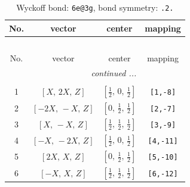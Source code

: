 \documentclass[fleqn,8pt]{jsarticle}
\begin{document}
\renewcommand{\arraystretch}{1.2}
\begin{longtable}{cccc}
\caption{Wyckoff bond: {\tt 6e@3g}, bond symmetry: {\tt .2.}}
 \\
 \hline \hline
No. & vector & center & mapping \\ \hline \endfirsthead

\multicolumn{3}{l}{\tablename\ \thetable{}} \\
 \hline \hline
No. & vector & center & mapping \\ \hline \endhead

 \hline \hline
\multicolumn{3}{r}{\footnotesize\it continued ...} \\ \endfoot

 \hline \hline
\multicolumn{3}{r}{} \\ \endlastfoot

1 & $\left[ X,\, 2 X,\, Z \right]$ & $\left[ \frac{1}{2},\, 0,\, \frac{1}{2} \right]$ & {\tt [1,-8]} \\ \hline
2 & $\left[ - 2 X,\, - X,\, Z \right]$ & $\left[ 0,\, \frac{1}{2},\, \frac{1}{2} \right]$ & {\tt [2,-7]} \\ \hline
3 & $\left[ X,\, - X,\, Z \right]$ & $\left[ \frac{1}{2},\, \frac{1}{2},\, \frac{1}{2} \right]$ & {\tt [3,-9]} \\ \hline
4 & $\left[ - X,\, - 2 X,\, Z \right]$ & $\left[ \frac{1}{2},\, 0,\, \frac{1}{2} \right]$ & {\tt [4,-11]} \\ \hline
5 & $\left[ 2 X,\, X,\, Z \right]$ & $\left[ 0,\, \frac{1}{2},\, \frac{1}{2} \right]$ & {\tt [5,-10]} \\ \hline
6 & $\left[ - X,\, X,\, Z \right]$ & $\left[ \frac{1}{2},\, \frac{1}{2},\, \frac{1}{2} \right]$ & {\tt [6,-12]} \\
\end{longtable}
\renewcommand{\arraystretch}{1.2}
\end{document}
